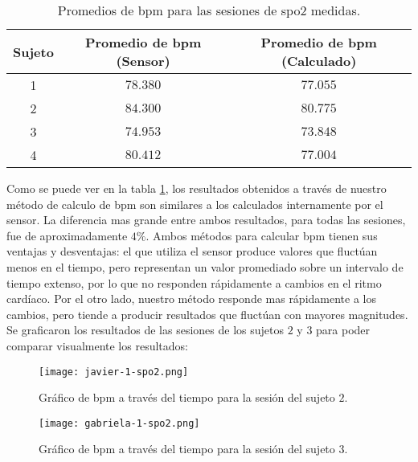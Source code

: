 \begin{table}[H]
\centering
\begin{tabular}{ |c|c|c| } 
 \hline
 Sujeto & Promedio de \acrshort{bpm} (Sensor) & Promedio de \acrshort{bpm} (Calculado) \\ 
 \hline
 1 & $78.380$ & $77.055$ \\
 \hline
 2 & $84.300$ & $80.775$ \\
 \hline
 3 & $74.953$ & $73.848$ \\
 \hline
 4 & $80.412$ & $77.004$ \\

 \hline
\end{tabular}
\caption{Promedios de \acrshort{bpm} para las sesiones de \acrshort{spo2} medidas.}
\label{tab:spo2-results}
\end{table}

Como se puede ver en la tabla \ref{tab:spo2-results}, los resultados obtenidos a través de nuestro método de calculo de \acrshort{bpm} son similares a los calculados internamente por el sensor. La diferencia mas grande entre ambos resultados, para todas las sesiones, fue de aproximadamente $4\%$. Ambos métodos para calcular \acrshort{bpm} tienen sus ventajas y desventajas: el que utiliza el sensor produce valores que fluctúan menos en el tiempo, pero representan un valor promediado sobre un intervalo de tiempo extenso, por lo que no responden rápidamente a cambios en el ritmo cardíaco. Por el otro lado, nuestro método responde mas rápidamente a los cambios, pero tiende a producir resultados que fluctúan con mayores magnitudes. Se graficaron los resultados de las sesiones de los sujetos $2$ y $3$ para poder comparar visualmente los resultados:

\begin{figure}[H]
	\centering
    \texttt{[image: javier-1-spo2.png]}
    \caption{Gráfico de \acrshort{bpm} a través del tiempo para la sesión del sujeto $2$.}
	\label{fig:spo2-graph-2}
\end{figure}

\begin{figure}[H]
	\centering
    \texttt{[image: gabriela-1-spo2.png]}
    \caption{Gráfico de \acrshort{bpm} a través del tiempo para la sesión del sujeto $3$.}
	\label{fig:spo2-graph-3}
\end{figure}

